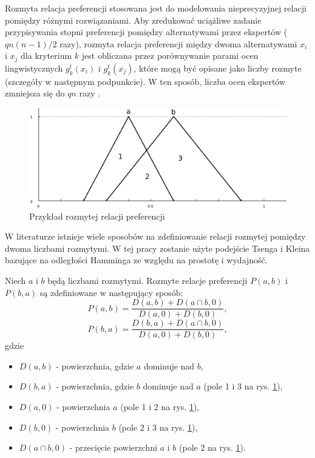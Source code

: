 Rozmyta relacja preferencji stosowana jest do modelowania
nieprecyzyjnej relacji pomiędzy różnymi rozwiązaniami. Aby zredukować uciążliwe
zadanie przypisywania stopni preferencji pomiędzy alternatywami przez ekspertów
($qn(n-1)/2$ razy), rozmyta relacja preferencji między dwoma alternatywami $x_i$
i $x_j$ dla kryterium $k$ jest obliczana przez porównywanie parami ocen
lingwistycznych $g^t_k(x_i)$ i $g^t_k(x_j)$, które mogą być opisane jako liczby
rozmyte (szczegóły w następnym podpunkcie). W ten sposób, liczba ocen ekspertów
zmniejsza się do $qn$ razy \cite{Wang2003}.
\begin{figure}[ht]
  \includegraphics[width=\linewidth]
    {chapters/preferences/rozmyta_relacja_a}
  \caption{Przykład rozmytej relacji preferencji}
  \label{fig:rozmyta_relacja_preferencji}
\end{figure}
W literaturze istnieje wiele sposobów na zdefiniowanie relacji rozmytej pomiędzy
dwoma liczbami rozmytymi. W tej pracy zostanie użyte podejście Tsenga i Kleina
\cite{Tseng1989} bazujące na odległości Hamminga ze względu na prostotę i
wydajność.

\begin{definition}
\label{def:rozmyta_relacja_preferencji}
Niech $a$ i $b$ bę\-dą licz\-ba\-mi rozmytymi. Roz\-my\-te relacje preferencji
$P(a,b)$ i $P(b,a)$ są zdefiniowane w następujący sposób:
\begin{equation}
P(a,b) = \frac{D(a,b) + D(a \cap b, 0)}{D(a,0) + D(b,0)},
\end{equation}
\begin{equation}
P(b,a) = \frac{D(b,a) + D(a \cap b, 0)}{D(a,0) + D(b,0)},
\end{equation}
gdzie
\begin{itemize}
  \item[] $D(a,b)$ - powierzchnia, gdzie $a$ dominuje nad $b$,
  \item[] $D(b,a)$ - powierzchnia, gdzie $b$ dominuje nad $a$ (pole 1 i 3 na
  	rys. \ref{fig:rozmyta_relacja_preferencji}),
  \item[] $D(a,0)$ - powierzchnia $a$ (pole 1 i 2 na rys.
     \ref{fig:rozmyta_relacja_preferencji}),
  \item[] $D(b,0)$ - powierzchnia $b$ (pole 2 i 3 na rys.
  	\ref{fig:rozmyta_relacja_preferencji}),
  \item[] $D(a \cap b, 0)$ - przecięcie powierzchni $a$ i $b$ (pole 2 na rys.
  	\ref{fig:rozmyta_relacja_preferencji}).
\end{itemize}
\end{definition}

